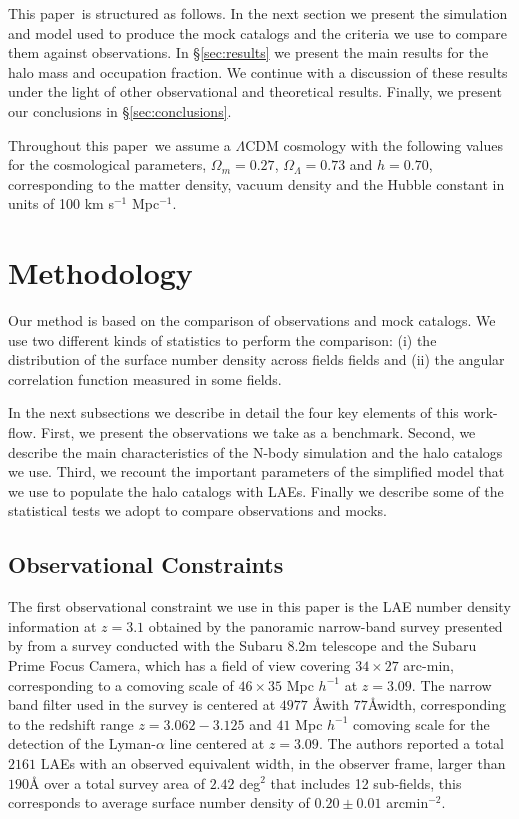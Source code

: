 \documentclass[usenatbib]{mn2e}
\newcommand{\documentname}{paper~}
\begin{document}
This \documentname is structured as follows. In the next section we present
the simulation and model used to produce the mock catalogs and the criteria
we use to compare them against observations. In \S \ref{sec:results} we
present the main results for the halo mass and occupation fraction. We
continue with a discussion of these results under the light of other
observational and theoretical results. Finally, we present our
conclusions in \S \ref{sec:conclusions}. 

Throughout this \documentname we assume a $\Lambda$CDM cosmology with the
following values for the cosmological parameters, $\Omega_{m}=0.27$,
$\Omega_{\Lambda}=0.73$ and $h=0.70$, corresponding to the matter
density, vacuum density and the Hubble constant in units of 100 km
s$^{-1}$ Mpc$^{-1}$. 

\section{Methodology}


Our method is based on the comparison of observations and mock
catalogs. We use two different kinds of statistics to perform the
comparison: (i) the distribution of the surface number density
across fields fields and (ii) the angular correlation function measured in
some fields.

In the next subsections we describe in detail the four key
elements of this work-flow. First, we present the observations we take
as a benchmark. Second, we describe the main characteristics of the
N-body simulation and the halo catalogs we use. Third, we recount the
important parameters of the simplified model that we use to populate
the halo catalogs with LAEs. Finally we describe some of the
statistical tests we adopt to compare observations and mocks.

\subsection{Observational Constraints}

The first observational constraint we use in this paper is the LAE number
density information at $z=3.1$ obtained by the panoramic narrow-band
survey presented by \cite{Yamada2012} from a survey
conducted with the Subaru 8.2m telescope and the Subaru Prime Focus Camera,
which has a field of view covering $34\times 27$ arc-min, corresponding to a
comoving scale of $46\times35$ Mpc $h^{-1}$ at $z=3.09$.  The narrow
band filter used in the survey is centered at $4977$ \AA with  $77$\AA width,
corresponding to the redshift range $z=3.062-3.125$ and $41$ Mpc
$h^{-1}$ comoving scale for the detection of the Lyman-$\alpha$ line
centered at $z=3.09$. The authors reported a
total  $2161$  LAEs with an observed equivalent width, in the observer
frame, larger than $190$\AA 
over a total survey area of $2.42$ deg$^{2}$ that includes 12 sub-fields, 
this corresponds to average surface number density of $0.20\pm 0.01$
arcmin$^{-2}$.    
\end{document}
